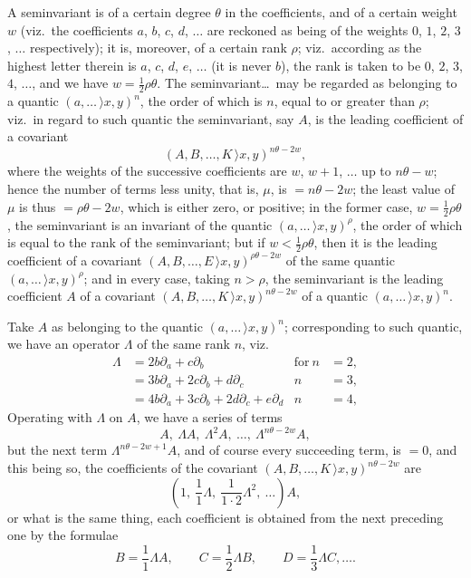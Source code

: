 \documentclass[11pt,a4paper]{article}
\providecommand{\textsc}[1]{{\scshape #1}}
\begin{document}
\medskip
A seminvariant is of a certain degree $\theta$ in the coefficients, and of a certain weight $w$ (viz.\ the coefficients $a$, $b$, $c$, $d$, $\ldots$ are reckoned as being of the weights $0$, $1$, $2$, $3$, $\ldots$ respectively); it is, moreover, of a certain rank $\rho$; viz.\ according as the highest letter therein is $a$, $c$, $d$, $e$, $\ldots$ (it is never $b$), the rank is taken to be $0$, $2$, $3$, $4$, $\ldots$, and we have $w = \tfrac{1}{2}\rho\theta$. The seminvariant\ldots\ may be regarded as belonging to a quantic $(a, \ldots\,\rangle x, y)^{n}$, the order of which is $n$, equal to or greater than $\rho$; viz.\ in regard to such quantic the seminvariant, say $A$, is the leading coefficient of a covariant
\[
(A, B, \ldots, K\,\rangle x, y)^{n\theta - 2w},
\]
where the weights of the successive coefficients are $w$, $w+1$, $\ldots$ up to $n\theta - w$; hence the number of terms less unity, that is, $\mu$, is $= n\theta - 2w$; the least value of $\mu$ is thus $= \rho\theta - 2w$, which is either zero, or positive; in the former case, $w = \tfrac{1}{2}\rho\theta$, the seminvariant is an invariant of the quantic $(a, \ldots\,\rangle x, y)^{\rho}$, the order of which is equal to the rank of the seminvariant; but if $w < \tfrac{1}{2}\rho\theta$, then it is the leading coefficient of a covariant $(A, B, \ldots, E\,\rangle x, y)^{\rho\theta - 2w}$ of the same quantic $(a, \ldots\,\rangle x, y)^{\rho}$; and in every case, taking $n > \rho$, the seminvariant is the leading coefficient $A$ of a covariant $(A, B, \ldots, K\,\rangle x, y)^{n\theta - 2w}$ of a quantic $(a, \ldots\,\rangle x, y)^{n}$.
\clearpage

\fancyhead[L]{\small 801]}
\fancyhead[C]{\small\textsc{on seminvariants.}}

\thispagestyle{plain}
\noindent Take $A$ as belonging to the quantic $(a, \ldots\,\rangle x, y)^{n}$; corresponding to such quantic, we have an operator $\Lambda$ of the same rank $n$, viz.
\begin{align*}
\Lambda &= 2b\partial_{a} + c\partial_{b}                                  & \text{for}\ n &= 2,\\
       &= 3b\partial_{a} + 2c\partial_{b} + d\partial_{c}                  & n &= 3,\\
       &= 4b\partial_{a} + 3c\partial_{b} + 2d\partial_{c} + e\partial_{d} & n &= 4,
\end{align*}
\medskip
Operating with $\Lambda$ on $A$, we have a series of terms
\[
A,\ \Lambda A,\ \Lambda^{2}\!A,\ \ldots,\ \Lambda^{n\theta - 2w}\!A,
\]
but the next term $\Lambda^{n\theta - 2w + 1}\!A$, and of course every succeeding term, is $= 0$, and this being so, the coefficients of the covariant $(A, B, \ldots, K\,\rangle x, y)^{n\theta - 2w}$ are
\[
\left(1,\ \frac{1}{1}\Lambda,\ \frac{1}{1\cdot 2}\Lambda^{2},\ \ldots\right)\!A,
\]
or what is the same thing, each coefficient is obtained from the next preceding one by the formulae
\[
B=\frac{1}{1}\Lambda A,\qquad C=\frac{1}{2}\Lambda B,\qquad D=\frac{1}{3}\Lambda C,\ldots.
\]
\end{document}
